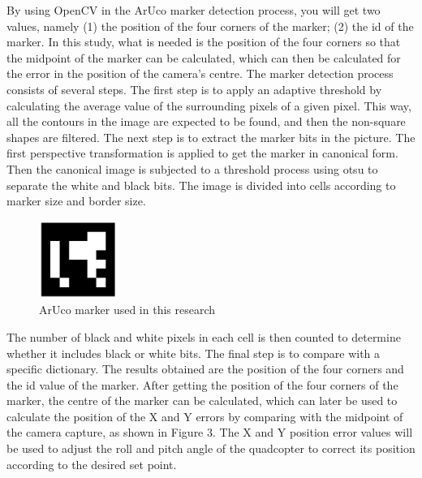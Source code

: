 \documentclass[a4paper]{jpconf}
\begin{document}
By using OpenCV in the ArUco marker detection process, you will get two values, namely (1) the position of the four corners of the marker; (2) the id of the marker. In this study, what is needed is the position of the four corners so that the midpoint of the marker can be calculated, which can then be calculated for the error in the position of the camera's centre. The marker detection process consists of several steps. The first step is to apply an adaptive threshold by calculating the average value of the surrounding pixels of a given pixel. This way, all the contours in the image are expected to be found, and then the non-square shapes are filtered. The next step is to extract the marker bits in the picture. The first perspective transformation is applied to get the marker in canonical form. Then the canonical image is subjected to a threshold process using otsu to separate the white and black bits. The image is divided into cells according to marker size and border size.

\begin{figure}[h]
    \centering
    \includegraphics[width=6pc]{ArUco-land.png}\hspace{2pc}%
    \begin{minipage}[b]{14pc}\caption{\label{label}ArUco marker used in this research}
    \end{minipage}
\end{figure}

The number of black and white pixels in each cell is then counted to determine whether it includes black or white bits. The final step is to compare with a specific dictionary. The results obtained are the position of the four corners and the id value of the marker. After getting the position of the four corners of the marker, the centre of the marker can be calculated, which can later be used to calculate the position of the X and Y errors by comparing with the midpoint of the camera capture, as shown in Figure 3. The X and Y position error values will be used to adjust the roll and pitch angle of the quadcopter to correct its position according to the desired set point.
\end{document}
